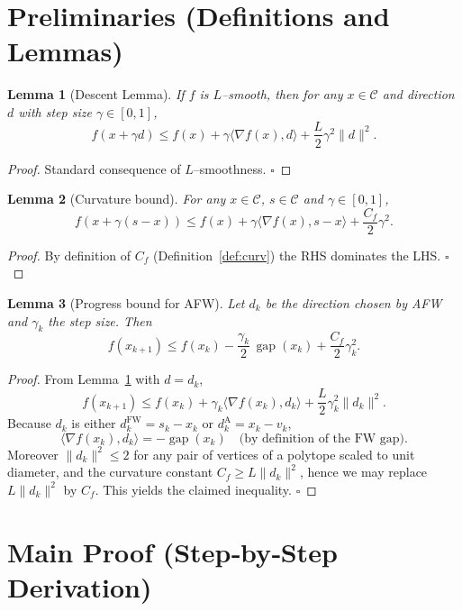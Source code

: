 \documentclass{article}
\newtheorem{lemma}{Lemma}
\newcommand{\C}{\mathcal{C}}
\newcommand{\gap}{\operatorname{gap}}
\begin{document}
\newpage
\section*{Preliminaries (Definitions and Lemmas)}

\begin{lemma}[Descent Lemma]\label{lem:descent}
If $f$ is $L$–smooth, then for any $x\in\C$ and direction $d$ with step size $\gamma\in[0,1]$,
\[
f(x+\gamma d)\le f(x)+\gamma\langle\nabla f(x),d\rangle+\frac{L}{2}\gamma^{2}\|d\|^{2}.
\]
\end{lemma}
\begin{proof}
Standard consequence of $L$–smoothness. \hfill $\square$
\end{proof}

\begin{lemma}[Curvature bound]\label{lem:curvature}
For any $x\in\C$, $s\in\C$ and $\gamma\in[0,1]$,
\[
f(x+\gamma(s-x))\le f(x)+\gamma\langle\nabla f(x),s-x\rangle+\frac{C_{f}}{2}\gamma^{2}.
\]
\end{lemma}
\begin{proof}
By definition of $C_{f}$ (Definition~\ref{def:curv}) the RHS dominates the LHS.
\hfill $\square$
\end{proof}

\begin{lemma}[Progress bound for AFW]\label{lem:progress}
Let $d_{k}$ be the direction chosen by AFW and $\gamma_{k}$ the step size.
Then
\[
f(x_{k+1})\le f(x_{k})-\frac{\gamma_{k}}{2}\,\gap(x_{k})+\frac{C_{f}}{2}\gamma_{k}^{2}.
\]
\end{lemma}
\begin{proof}
From Lemma~\ref{lem:descent} with $d=d_{k}$,
\[
f(x_{k+1})\le f(x_{k})+\gamma_{k}\langle\nabla f(x_{k}),d_{k}\rangle
               +\frac{L}{2}\gamma_{k}^{2}\|d_{k}\|^{2}.
\]
Because $d_{k}$ is either $d^{\text{FW}}_{k}=s_{k}-x_{k}$ or $d^{\text{A}}_{k}=x_{k}-v_{k}$,
\[
\langle\nabla f(x_{k}),d_{k}\rangle
= -\gap(x_{k})\quad\text{(by definition of the FW gap).}
\]
Moreover $\|d_{k}\|^{2}\le 2$ for any pair of vertices of a polytope scaled to unit diameter, and the curvature constant $C_{f}\ge L\|d_{k}\|^{2}$, hence we may replace $L\|d_{k}\|^{2}$ by $C_{f}$. This yields the claimed inequality. \hfill $\square$
\end{proof}

\section*{Main Proof (Step‑by‑Step Derivation)}
\end{document}
